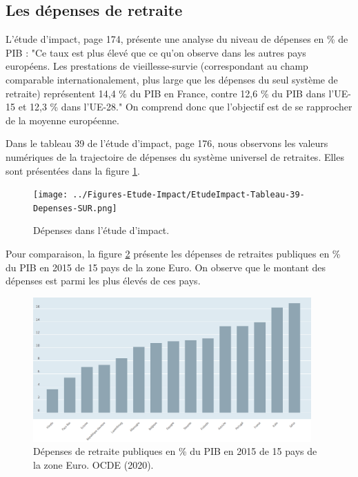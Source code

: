 \documentclass[10pt]{article}
\begin{document}

\subsection{Les dépenses de retraite}

L'étude d'impact, page 174, présente une analyse du niveau de dépenses 
en \% de PIB : "Ce taux est plus élevé que ce qu’on observe dans 
les autres pays européens. Les prestations de vieillesse-survie 
(correspondant au champ comparable internationalement, plus 
large que les dépenses du seul système de retraite) représentent 
14,4 \% du PIB en France, contre 12,6 \% du PIB dans l’UE-15 et 12,3 \% dans l’UE-28."
On comprend donc que l'objectif est de se rapprocher de la moyenne européenne. 

Dans le tableau 39 de l'étude d'impact, page 176, nous observons les valeurs numériques de la trajectoire de dépenses du système universel de retraites. 
Elles sont présentées dans la figure \ref{fig-depenses-etude-impact}.

\begin{figure}
\begin{center}
\texttt{[image: ../Figures-Etude-Impact/EtudeImpact-Tableau-39-Depenses-SUR.png]}
\end{center}
\caption{Dépenses dans l'étude d'impact.}
\label{fig-depenses-etude-impact}
\end{figure}

Pour comparaison, la figure \ref{fig-depenses-UE-15-2020} présente les dépenses de retraites 
publiques en \% du PIB en 2015 de 15 pays de la zone Euro.  
On observe que le montant des dépenses est parmi les plus élevés de ces pays. 

\begin{figure}
\begin{center}
\includegraphics[width=0.95\textwidth]{Depenses-retraites-2015-UE-15.png}
\end{center}
\caption{Dépenses de retraite publiques en \% du PIB en 2015 de 15 pays de la zone Euro. 
OCDE (2020). }
\label{fig-depenses-UE-15-2020}
\end{figure}
\end{document}
